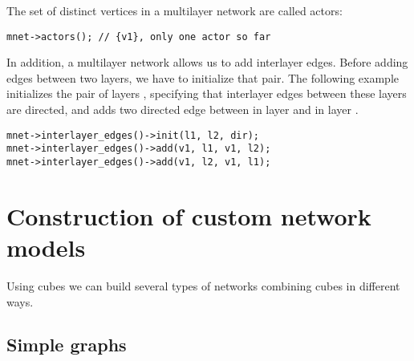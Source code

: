 The set of distinct vertices in a multilayer network are called actors:
\begin{lstlisting}[style=c++]
mnet->actors(); // {v1}, only one actor so far
\end{lstlisting}

In addition, a multilayer network allows us to add interlayer edges. Before adding edges between two layers, we have to initialize that pair. The following example initializes the pair of layers , specifying that interlayer edges between these layers are directed, and adds two directed edge between  in layer  and  in layer .
\begin{lstlisting}[style=c++]
mnet->interlayer_edges()->init(l1, l2, dir); 
mnet->interlayer_edges()->add(v1, l1, v1, l2);
mnet->interlayer_edges()->add(v1, l2, v1, l1);
\end{lstlisting}


\section{Construction of custom network models}\label{ch:nets:cubes}

Using cubes we can build several types of networks combining cubes in different ways. 

\subsection{Simple graphs}

